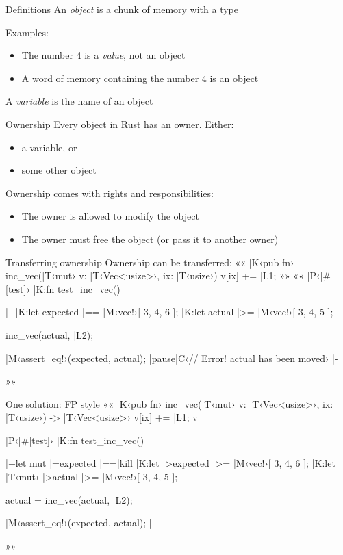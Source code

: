 \documentclass{beamer}
\begin{document}
\begin{frame}
\thispagestyle{empty}\centering
{}
\end{frame}

\begin{frame}{Definitions}{}
  An \emph{object} is a chunk of memory with a type
  \par
  Examples:
  \begin{itemize}
    \item The number 4 is a \emph{value}, not an object
    \item A word of memory containing the number 4 is an object
  \end{itemize}
  A \emph{variable} is the name of an object
\end{frame}

\begin{frame}{Ownership}{}
  Every object in Rust has an owner. Either:
  \begin{itemize}
    \item a variable, or
    \item some other object
  \end{itemize}
  \par\pause\medskip
  Ownership comes with rights and responsibilities:
  \begin{itemize}
    \item The owner is allowed to modify the object
    \item The owner must free the object (or pass it to another owner)
  \end{itemize}
\end{frame}

\begin{frame}[fragile]{Transferring ownership}{}
  Ownership can be transferred:
  ««
  |K‹pub fn› inc_vec(|T‹mut› v: |T‹Vec<usize>›, ix: |T‹usize›) {
    	v[ix] += |L1;
  }
  »»
  \pause
  ««
  |P‹|#[test]›
  |K:fn test_inc_vec() {
  	|+|K:let expected |== |M‹vec!›[ 3, 4, 6 ];
    |K:let actual   |>= |M‹vec!›[ 3, 4, 5 ];

    inc_vec(actual, |L2);

    |M‹assert_eq!›(expected, actual); |pause|C‹// Error! actual has been moved› |-
  }
  »»
\end{frame}

\begin{frame}[fragile]{One solution: FP style}
  ««
  |K‹pub fn› inc_vec(|T‹mut› v: |T‹Vec<usize>›, ix: |T‹usize›) -> |T‹Vec<usize>› {
    	v[ix] += |L1;
    	v
  }

  |P‹|#[test]›
  |K:fn test_inc_vec() {
  	|+let mut |=expected |==|kill%
    |K:let |>expected     |>= |M‹vec!›[ 3, 4, 6 ];
    |K:let |T‹mut› |>actual |>= |M‹vec!›[ 3, 4, 5 ];

    actual = inc_vec(actual, |L2);

    |M‹assert_eq!›(expected, actual); |-
  }
  »»
\end{frame}
\end{document}
